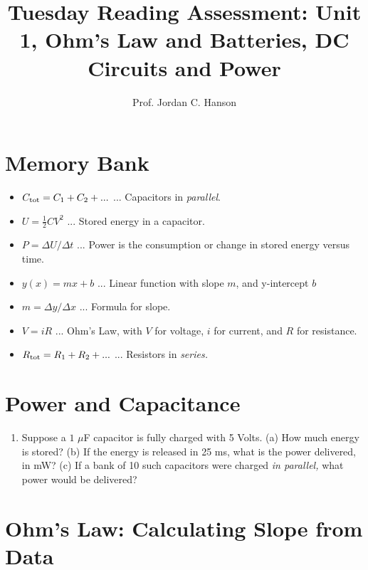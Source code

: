 \documentclass{article}
\begin{document}
\title{Tuesday Reading Assessment: Unit 1, Ohm's Law and Batteries, DC Circuits and Power}
\author{Prof. Jordan C. Hanson}

\maketitle

\section{Memory Bank}

\begin{itemize}
\item $C_{\rm tot} = C_1 + C_2 + ...$ ... Capacitors in \textit{parallel}.
\item $U = \frac{1}{2}C V^2$ ... Stored energy in a capacitor.
\item $P = \Delta U/\Delta t$ ... Power is the consumption or change in stored energy versus time.
\item $y(x) = mx + b$ ... Linear function with slope $m$, and y-intercept $b$
\item $m = \Delta y / \Delta x$ ... Formula for slope.
\item $V = i R$ ... Ohm's Law, with $V$ for voltage, $i$ for current, and $R$ for resistance.
\item $R_{\rm tot} = R_1 + R_2 + ...$ ... Resistors in \textit{series.}
\end{itemize}

\section{Power and Capacitance}

\begin{enumerate}
\item Suppose a $1$ $\mu$F capacitor is fully charged with 5 Volts.  (a) How much energy is stored? (b) If the energy is released in 25 ms, what is the power delivered, in mW? (c) If a bank of 10 such capacitors were charged \textit{in parallel,} what power would be delivered? \\ \vspace{1cm}
\end{enumerate}

\section{Ohm's Law: Calculating Slope from Data}
\end{document}
